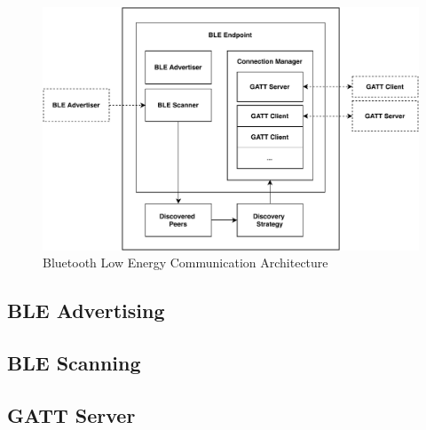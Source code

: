 



\begin{figure}
    \includegraphics[width=\textwidth]{diagrams/bluetooth-architecture}
    \caption{Bluetooth Low Energy Communication Architecture}
\end{figure}

\subsection{BLE Advertising}

\subsection{BLE Scanning}

\subsection{GATT Server}

